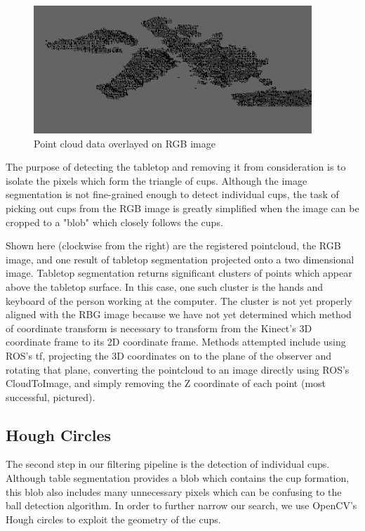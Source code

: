 \documentclass[letterpaper, 10 pt, conference]{ieeeconf}  %
\begin{document}
\begin{figure}[thpb]
      \centering
	  \includegraphics[scale =0.5]{point_rgb}
      \caption{Point cloud data overlayed on RGB image}
      \label{fig:point_rgb}
\end{figure}

The purpose of detecting the tabletop and removing it from consideration is to isolate the pixels which form the triangle of cups.  Although the image segmentation is not fine-grained enough to detect individual cups, the task of picking out cups from the RGB image is greatly simplified when the image can be cropped to a "blob" which closely follows the cups.

Shown here (clockwise from the right) are the registered pointcloud, the RGB image, and one result of tabletop segmentation projected onto a two dimensional image.  Tabletop segmentation returns significant clusters of points which appear above the tabletop surface.  In this case, one such cluster is the hands and keyboard of the person working at the computer.  The cluster is not yet properly aligned with the RBG image because we have not yet determined which method of coordinate transform is necessary to transform from the Kinect's 3D coordinate frame to its 2D coordinate frame.  Methods attempted include using ROS's tf, projecting the 3D coordinates on to the plane of the observer and rotating that plane, converting the pointcloud to an image directly using ROS's CloudToImage, and simply removing the Z coordinate of each point (most successful, pictured).


\subsection{Hough Circles}

The second step in our filtering pipeline is the detection of individual cups.  Although table segmentation provides a blob which contains the cup formation, this blob also includes many unnecessary pixels which can be confusing to the ball detection algorithm.  In order to further narrow our search, we use OpenCV's Hough circles to exploit the geometry of the cups.  
\end{document}
